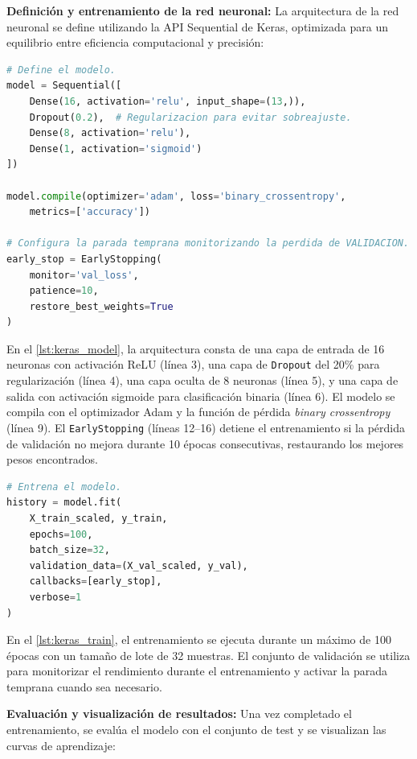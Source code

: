\textbf{Definición y entrenamiento de la red neuronal:} La arquitectura de la red neuronal se define utilizando la API Sequential de Keras, optimizada para un equilibrio entre eficiencia computacional y precisión:

\begin{lstlisting}[language=Python, caption={Definición de la arquitectura de la red neuronal.}, label={lst:keras_model}]
# Define el modelo.
model = Sequential([
    Dense(16, activation='relu', input_shape=(13,)),
    Dropout(0.2),  # Regularizacion para evitar sobreajuste.
    Dense(8, activation='relu'),
    Dense(1, activation='sigmoid')
])

model.compile(optimizer='adam', loss='binary_crossentropy', 
    metrics=['accuracy'])

# Configura la parada temprana monitorizando la perdida de VALIDACION.
early_stop = EarlyStopping(
    monitor='val_loss',
    patience=10,
    restore_best_weights=True
)
\end{lstlisting}

En el \autoref{lst:keras_model}, la arquitectura consta de una capa de entrada de 16 neuronas con activación ReLU (línea 3), una capa de \texttt{Dropout} del 20\% para regularización (línea 4), una capa oculta de 8 neuronas (línea 5), y una capa de salida con activación sigmoide para clasificación binaria (línea 6). El modelo se compila con el optimizador Adam y la función de pérdida \textit{binary crossentropy} (línea 9). El \texttt{EarlyStopping} (líneas 12--16) detiene el entrenamiento si la pérdida de validación no mejora durante 10 épocas consecutivas, restaurando los mejores pesos encontrados.

\begin{lstlisting}[language=Python, caption={Entrenamiento del modelo con validación.}, label={lst:keras_train}]
# Entrena el modelo.
history = model.fit(
    X_train_scaled, y_train,
    epochs=100,
    batch_size=32,
    validation_data=(X_val_scaled, y_val),
    callbacks=[early_stop],
    verbose=1
)
\end{lstlisting}

En el \autoref{lst:keras_train}, el entrenamiento se ejecuta durante un máximo de 100 épocas con un tamaño de lote de 32 muestras. El conjunto de validación se utiliza para monitorizar el rendimiento durante el entrenamiento y activar la parada temprana cuando sea necesario.

\textbf{Evaluación y visualización de resultados:} Una vez completado el entrenamiento, se evalúa el modelo con el conjunto de test y se visualizan las curvas de aprendizaje:

